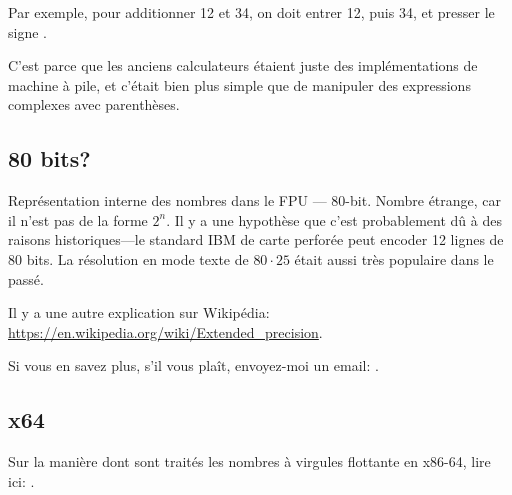 Par exemple, pour additionner 12 et 34, on doit entrer 12, puis 34, et presser le
signe .

C'est parce que les anciens calculateurs étaient juste des implémentations de machine
à pile, et c'était bien plus simple que de manipuler des expressions complexes avec
parenthèses.

\subsection{80 bits?}


Représentation interne des nombres dans le FPU --- 80-bit.
Nombre étrange, car il n'est pas de la forme $2^n$.
Il y a une hypothèse que c'est probablement dû à des raisons historiques---le standard
IBM de carte perforée peut encoder 12 lignes de 80 bits.
La résolution en mode texte de $80\cdot 25$ était aussi très populaire dans le passé.

Il y a une autre explication sur Wikipédia: \url{https://en.wikipedia.org/wiki/Extended_precision}.

Si vous en savez plus, s'il vous plaît, envoyez-moi un email: \EMAIL{}.

\subsection{x64}

Sur la manière dont sont traités les nombres à virgules flottante en x86-64, lire
ici: .




